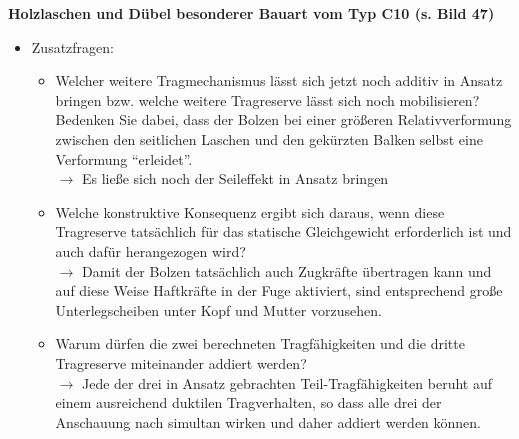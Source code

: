 \documentclass[fleqn,twoside]{article}
\begin{document}
        \vspace*{5mm}

        \textbf{Holzlaschen und Dübel besonderer Bauart vom Typ C10 (s. Bild 47)}\\
        \begin{minipage}{0.55\textwidth}
        \begin{itemize}
            \item Zusatzfragen:
                \begin{itemize}
                    \item Welcher weitere Tragmechanismus lässt sich jetzt noch additiv in Ansatz bringen bzw. welche weitere Tragreserve lässt sich noch mobilisieren? Bedenken Sie dabei, dass der Bolzen bei einer größeren Relativverformung zwischen den seitlichen Laschen und den gekürzten Balken selbst eine Verformung \enquote{erleidet}.\\
                    $\rightarrow$ Es ließe sich noch der Seileffekt in Ansatz bringen
                    \item Welche konstruktive Konsequenz ergibt sich daraus, wenn diese Tragreserve tatsächlich für das statische Gleichgewicht erforderlich ist und auch dafür herangezogen wird?\\
                    $\rightarrow$ Damit der Bolzen tatsächlich auch Zugkräfte übertragen kann und auf diese Weise Haftkräfte in der Fuge aktiviert, sind entsprechend große Unterlegscheiben unter Kopf und Mutter vorzusehen.
                    \item Warum dürfen die zwei berechneten Tragfähigkeiten und die dritte Tragreserve miteinander addiert werden?\\
                    $\rightarrow$ Jede der drei in Ansatz gebrachten Teil-Tragfähigkeiten beruht auf einem ausreichend duktilen Tragverhalten, so dass alle drei der Anschauung nach simultan wirken und daher addiert werden können.
                \end{itemize}
        \end{itemize}
        \end{minipage}    
\end{document}
